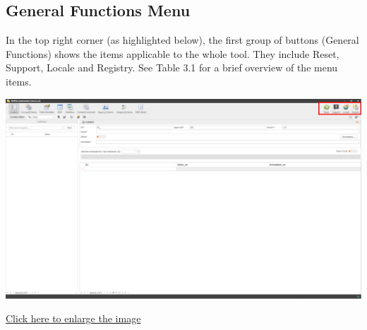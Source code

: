 \documentclass[
]{book}
\theoremstyle{definition}
\theoremstyle{definition}
\theoremstyle{definition}
\theoremstyle{definition}
\theoremstyle{remark}
\begin{document}
\hypertarget{general-functions-menu}{%
\subsection{General Functions Menu}\label{general-functions-menu}}

In the top right corner (as highlighted below), the first group of buttons (General Functions) shows the items applicable to the whole tool. They include Reset, Support, Locale and Registry. See Table 3.1 for a brief overview of the menu items.

\begin{center}\includegraphics[width=1\linewidth]{./images/image011} \end{center}

\href{images/image011.png}{Click here to enlarge the image}
\end{document}
